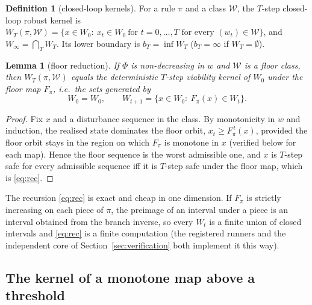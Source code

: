 \documentclass[11pt,a4paper]{article}
\theoremstyle{plain}
\newtheorem{lemma}[theorem]{Lemma}
\theoremstyle{definition}
\newtheorem{definition}[theorem]{Definition}
\theoremstyle{remark}
\newcommand{\safe}{W_0}
\begin{document}
\begin{definition}[closed-loop kernels]\label{def:kernel}
For a rule $\pi$ and a class $\mathcal W$, the $T$-step closed-loop robust kernel is
$W_T(\pi,\mathcal W)=\{x\in\safe:\ x_t\in\safe\ \text{for } t=0,\dots,T \text{ for every } (w_t)\in\mathcal W\}$, and $W_\infty=\bigcap_T W_T$. Its lower boundary is $b_T=\inf W_T$ ($b_T=\infty$ if $W_T=\emptyset$).
\end{definition}

\begin{lemma}[floor reduction]\label{lem:floor}
If $\Phi$ is non-decreasing in $w$ and $\mathcal W$ is a floor class, then $W_T(\pi,\mathcal W)$ equals the deterministic $T$-step viability kernel of $\safe$ under the floor map $F_\pi$, i.e.\ the sets generated by
\begin{equation}\label{eq:rec}
W_0=\safe,\qquad W_{t+1}=\{x\in\safe:\ F_\pi(x)\in W_t\}.
\end{equation}
\end{lemma}
\begin{proof}
Fix $x$ and a disturbance sequence in the class. By monotonicity in $w$ and induction, the realised state dominates the floor orbit, $x_t\ge F_\pi^{\,t}(x)$, provided the floor orbit stays in the region on which $F_\pi$ is monotone in $x$ (verified below for each map). Hence the floor sequence is the worst admissible one, and $x$ is $T$-step safe for every admissible sequence iff it is $T$-step safe under the floor map, which is \eqref{eq:rec}.
\end{proof}

The recursion \eqref{eq:rec} is exact and cheap in one dimension. If $F_\pi$ is strictly increasing on each piece of $\pi$, the preimage of an interval under a piece is an interval obtained from the branch inverse, so every $W_t$ is a finite union of closed intervals and \eqref{eq:rec} is a finite computation (the registered runners and the independent core of Section~\ref{sec:verification} both implement it this way).

\subsection{The kernel of a monotone map above a threshold}
\end{document}
